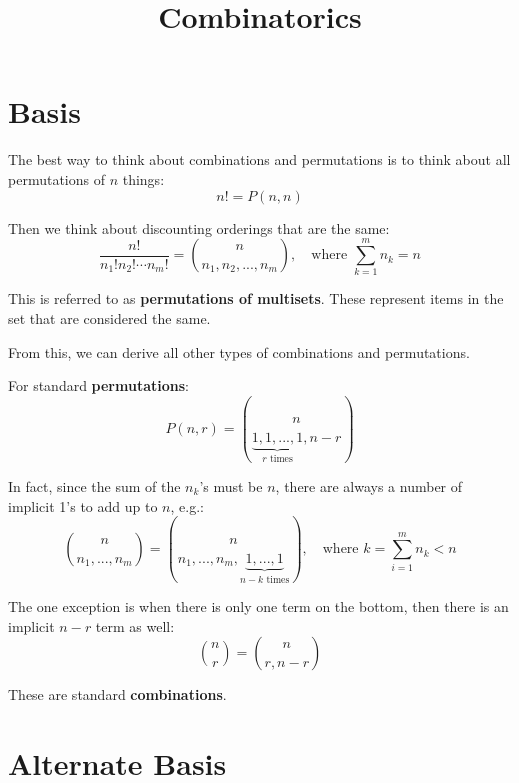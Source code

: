 \documentclass{article}
\title{Combinatorics}
\begin{document}
    \maketitle

    \tableofcontents

    \section{Basis}

    The best way to think about combinations and permutations is to think about all permutations of $n$ things: \begin{equation}
        n! = P(n, n)
    \end{equation}

    Then we think about discounting orderings that are the same: \begin{equation}
        \frac{n!}{n_1! n_2! \cdots n_m!} = {n \choose n_1, n_2, ..., n_m}, \quad \text{where } \sum_{k = 1}^m{n_k} = n
    \end{equation}

    This is referred to as \textbf{permutations of multisets}. These represent items in the set that are considered the same.

    From this, we can derive all other types of combinations and permutations.

    For standard \textbf{permutations}: \begin{equation}
        P(n, r) = {n \choose \underbrace{1, 1, ..., 1}_{r \text{ times}}, n - r}
    \end{equation}

    In fact, since the sum of the $n_k$'s must be $n$, there are always a number of implicit 1's to add up to $n$, e.g.: \begin{equation}
        {n \choose n_1, ..., n_m} = {n \choose n_1, ..., n_m, \underbrace{1, ..., 1}_{n - k \text{ times}}}, \quad \text{where } k = \sum_{i = 1}^m{n_k} < n
    \end{equation}

    The one exception is when there is only one term on the bottom, then there is an implicit $n - r$ term as well: \begin{equation}
        {n \choose r} = {n \choose r, n - r}
    \end{equation}

    These are standard \textbf{combinations}.
    
    \section{Alternate Basis}
\end{document}
